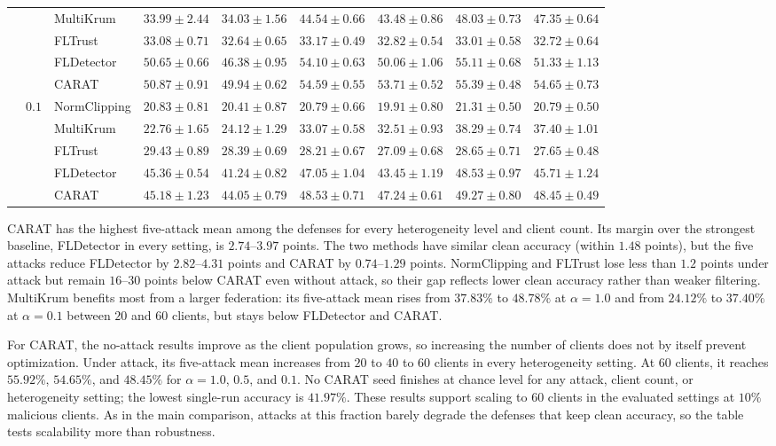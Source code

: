 \begin{table}[htbp]
\begin{tabular}{ccl cc cc cc}
&  & MultiKrum & $33.99\pm2.44$ & $34.03\pm1.56$ & $44.54\pm0.66$ & $43.48\pm0.86$ & $48.03\pm0.73$ & $47.35\pm0.64$ \\
&  & FLTrust & $33.08\pm0.71$ & $32.64\pm0.65$ & $33.17\pm0.49$ & $32.82\pm0.54$ & $33.01\pm0.58$ & $32.72\pm0.64$ \\
&  & FLDetector & $50.65\pm0.66$ & $46.38\pm0.95$ & $54.10\pm0.63$ & $50.06\pm1.06$ & $55.11\pm0.68$ & $51.33\pm1.13$ \\
&  & CARAT & $50.87\pm0.91$ & $\mathbf{49.94\pm0.62}$ & $54.59\pm0.55$ & $\mathbf{53.71\pm0.52}$ & $55.39\pm0.48$ & $\mathbf{54.65\pm0.73}$ \\
\cmidrule(lr){2-9}
& \multirow{5}{*}{$0.1$} & NormClipping & $20.83\pm0.81$ & $20.41\pm0.87$ & $20.79\pm0.66$ & $19.91\pm0.80$ & $21.31\pm0.50$ & $20.79\pm0.50$ \\
&  & MultiKrum & $22.76\pm1.65$ & $24.12\pm1.29$ & $33.07\pm0.58$ & $32.51\pm0.93$ & $38.29\pm0.74$ & $37.40\pm1.01$ \\
&  & FLTrust & $29.43\pm0.89$ & $28.39\pm0.69$ & $28.21\pm0.67$ & $27.09\pm0.68$ & $28.65\pm0.71$ & $27.65\pm0.48$ \\
&  & FLDetector & $45.36\pm0.54$ & $41.24\pm0.82$ & $47.05\pm1.04$ & $43.45\pm1.19$ & $48.53\pm0.97$ & $45.71\pm1.24$ \\
&  & CARAT & $45.18\pm1.23$ & $\mathbf{44.05\pm0.79}$ & $48.53\pm0.71$ & $\mathbf{47.24\pm0.61}$ & $49.27\pm0.80$ & $\mathbf{48.45\pm0.49}$ \\
\bottomrule
\end{tabular}
\end{table}

CARAT has the highest five-attack mean among the defenses for every heterogeneity level and client count. Its margin over the strongest baseline, FLDetector in every setting, is $2.74$--$3.97$ points. The two methods have similar clean accuracy (within $1.48$ points), but the five attacks reduce FLDetector by $2.82$--$4.31$ points and CARAT by $0.74$--$1.29$ points. NormClipping and FLTrust lose less than $1.2$ points under attack but remain $16$--$30$ points below CARAT even without attack, so their gap reflects lower clean accuracy rather than weaker filtering. MultiKrum benefits most from a larger federation: its five-attack mean rises from $37.83\%$ to $48.78\%$ at $\alpha=1.0$ and from $24.12\%$ to $37.40\%$ at $\alpha=0.1$ between $20$ and $60$ clients, but stays below FLDetector and CARAT.

For CARAT, the no-attack results improve as the client population grows, so increasing the number of clients does not by itself prevent optimization. Under attack, its five-attack mean increases from $20$ to $40$ to $60$ clients in every heterogeneity setting. At $60$ clients, it reaches $55.92\%$, $54.65\%$, and $48.45\%$ for $\alpha=1.0$, $0.5$, and $0.1$. No CARAT seed finishes at chance level for any attack, client count, or heterogeneity setting; the lowest single-run accuracy is $41.97\%$. These results support scaling to $60$ clients in the evaluated settings at $10\%$ malicious clients. As in the main comparison, attacks at this fraction barely degrade the defenses that keep clean accuracy, so the table tests scalability more than robustness.

